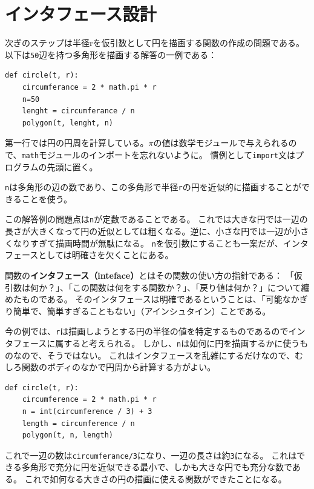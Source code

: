 \documentclass[a4j,12pt,makeidx]{jbook}
\begin{document}
\section{インタフェース設計}
次ぎのステップは半径rを仮引数として円を描画する関数の作成の問題である。以下は{\tt 50}辺を持つ多角形を描画する解答の一例である：
\begin{verbatim}
def circle(t, r):
    circumferance = 2 * math.pi * r
    n=50
    lenght = circumferance / n
    polygon(t, lenght, n)
 \end{verbatim}   
第一行では円の円周を計算している。$\pi$の値は数学モジュールで与えられるので、{\tt math}モジュールのインポートを忘れないように。
慣例として{\tt import}文はプログラムの先頭に置く。\par
{\tt n}は多角形の辺の数であり、この多角形で半径{\tt r}の円を近似的に描画することができることを使う。\par
この解答例の問題点は{\tt n}が定数であることである。
これでは大きな円では一辺の長さが大きくなって円の近似としては粗くなる。逆に、小さな円では一辺が小さくなりすぎて描画時間が無駄になる。
{\tt n}を仮引数にすることも一案だが、インタフェースとしては明確さを欠くことにある。\par
関数の{\bf インタフェース（inteface）}とはその関数の使い方の指針である：
「仮引数は何か？」、「この関数は何をする関数か？」、「戻り値は何か？」について纏めたものである。
そのインタフェースは明確であるということは、「可能なかぎり簡単で、簡単すぎることもない」（アインシュタイン）ことである。\par
今の例では、{\tt r}は描画しようとする円の半径の値を特定するものであるのでインタフェースに属すると考えられる。
しかし、{\tt n}は如何に円を描画するかに使うものなので、そうではない。
これはインタフェースを乱雑にするだけなので、むしろ関数のボディのなかで円周から計算する方がよい。
\begin{verbatim}
def circle(t, r):
    circumference = 2 * math.pi * r
    n = int(circumference / 3) + 3
    length = circumference / n
    polygon(t, n, length)
\end{verbatim}
これで一辺の数は{\tt circumferance/3}になり、一辺の長さは約{\tt 3}になる。
これはできる多角形で充分に円を近似できる最小で、しかも大きな円でも充分な数である。
これで如何なる大きさの円の描画に使える関数ができたことになる。
%
\end{document}
